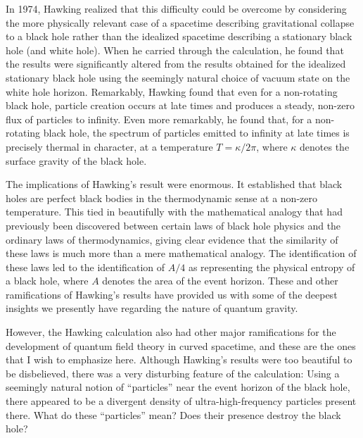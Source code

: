 In 1974, Hawking \cite{h1} realized that this difficulty could be
overcome by considering the more physically relevant case of a
spacetime describing gravitational collapse to a black hole rather
than the idealized spacetime describing a stationary black hole (and
white hole). When he carried through the calculation, he found that
the results were significantly altered from the results obtained
for the idealized stationary black hole using the seemingly natural
choice of vacuum state on the white hole horizon. Remarkably, Hawking found
that even for a non-rotating black hole, particle creation occurs at
late times and produces a steady, non-zero flux of particles to
infinity. Even more remarkably, he found that, for a non-rotating
black hole, the spectrum of particles emitted to infinity 
at late times is precisely
thermal in character, at a temperature $T = \kappa/2 \pi$, where
$\kappa$ denotes the surface gravity of the black hole.

The implications of Hawking's result were enormous. It established
that black holes are perfect black bodies in the thermodynamic sense
at a non-zero temperature. This tied in beautifully with the
mathematical analogy that had previously been discovered between certain
laws of black hole physics and the ordinary laws of thermodynamics,
giving clear evidence that the similarity of these laws is much more
than a mere mathematical analogy. The identification of these
laws led to the identification
of $A/4$ as representing the physical entropy of a black hole, where
$A$ denotes the area of the event horizon. These and other
ramifications of Hawking's results have provided us with some of the
deepest insights we presently have regarding the nature of quantum gravity.

However, the Hawking calculation also had other major ramifications
for the development of quantum field theory in curved spacetime, and
these are the ones that I wish to emphasize here.  Although Hawking's results
were too beautiful to be disbelieved, there was a very disturbing
feature of the calculation: Using a seemingly natural notion of
``particles'' near the event horizon of the black hole, there appeared to
be a divergent density of ultra-high-frequency
particles present there. What do these ``particles'' mean? Does
their presence destroy the black hole?

